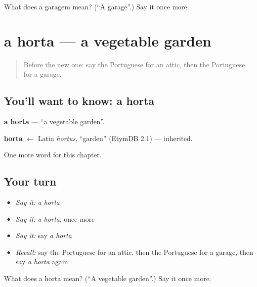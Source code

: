 \begin{tcolorbox}[breakable,colback=teal!4,colframe=teal!35!black,title={Before you move on}]
What does a garagem mean? (\textquotedblleft{}A garage\textquotedblright{}.) Say it once more.
\end{tcolorbox}
\section[a horta]{a horta — a vegetable garden}

\label{lesson:PT-C224-horta}



\begin{quote}
Before the new one: say the Portuguese for an attic, then the Portuguese for a garage.
\end{quote}

\subsection*{You'll want to know: a horta}
\textbf{a horta} — \textquotedblleft{}a vegetable garden\textquotedblright{}.

\begin{cousinweb}
\textbf{horta} $\leftarrow$ Latin \emph{hortus}, \textquotedblleft{}garden\textquotedblright{} (EtymDB 2.1) — inherited.
\end{cousinweb}

\begin{grammarlens}[title={What you've built}]
One more word for this chapter.
\end{grammarlens}

\subsection*{Your turn}
\begin{itemize}
\raggedright
  \item \emph{Say it:} \emph{a horta}
  \item \emph{Say it:} \emph{a horta}, once more
  \item \emph{Say it:} say \emph{a horta}
  \item \emph{Recall:} say the Portuguese for an attic, then the Portuguese for a garage, then say \emph{a horta} again
\end{itemize}

\begin{tcolorbox}[breakable,colback=teal!4,colframe=teal!35!black,title={Before you move on}]
What does a horta mean? (\textquotedblleft{}A vegetable garden\textquotedblright{}.) Say it once more.
\end{tcolorbox}
